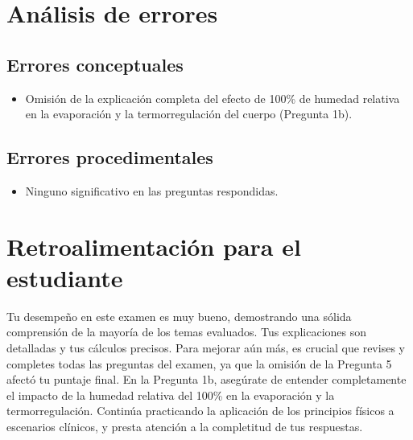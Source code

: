 \documentclass[11pt,a4paper]{article}
\begin{document}
\section*{Análisis de errores}

\subsection*{Errores conceptuales}
\begin{itemize}[leftmargin=1.5em, itemsep=2pt]
  \item Omisión de la explicación completa del efecto de 100\% de humedad relativa en la evaporación y la termorregulación del cuerpo (Pregunta 1b).
\end{itemize}

\subsection*{Errores procedimentales}
\begin{itemize}[leftmargin=1.5em, itemsep=2pt]
  \item Ninguno significativo en las preguntas respondidas.
\end{itemize}

\section*{Retroalimentación para el estudiante}
\begin{tcolorbox}[cajaRecomendacion, title={Dirigido a: Luisielis Marin}]
Tu desempeño en este examen es muy bueno, demostrando una sólida comprensión de la mayoría de los temas evaluados. Tus explicaciones son detalladas y tus cálculos precisos. Para mejorar aún más, es crucial que revises y completes todas las preguntas del examen, ya que la omisión de la Pregunta 5 afectó tu puntaje final. En la Pregunta 1b, asegúrate de entender completamente el impacto de la humedad relativa del 100\% en la evaporación y la termorregulación. Continúa practicando la aplicación de los principios físicos a escenarios clínicos, y presta atención a la completitud de tus respuestas.
\end{tcolorbox}

\end{document}
